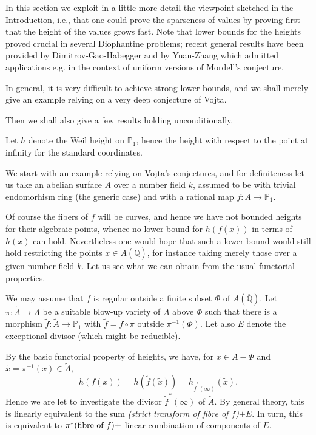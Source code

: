 \documentclass[leqno,12pt]{article} %
\def\Q{{{\mathbb Q}}}
\def\P{{{\mathbb P}}}
\theoremstyle{plain} %
\theoremstyle{definition} %
\begin{document}
In this section we exploit in a little more detail the viewpoint sketched in the Introduction, i.e., that one could prove the sparseness of values by proving first that the height of the values grows fast. Note that lower bounds for the heights proved crucial in several Diophantine problems; recent general results have been provided by {\sc Dimitrov-Gao-Habegger} \cite{DGH} and by {\sc Yuan-Zhang} \cite{YuZh} which admitted applications e.g. in the context of uniform versions of Mordell's conjecture.

In general, it is very difficult to achieve strong lower bounds, and we shall merely give an example relying on a very deep conjecture of {\sc Vojta}.

Then we shall also give a few results holding unconditionally.  %

\medskip

Let $h$ denote the Weil height on $\P_1$, hence the height with respect to the point at infinity for the standard coordinates.

We start with an example relying on Vojta's conjectures, and for definiteness let us take an abelian surface $A$ over a number field $k$, assumed to be with trivial endomorhism ring (the generic case) and with a rational map $f:A\to\P_1$. 

Of course the fibers of $f$ will be curves, and hence we  have not bounded heights for their algebraic points, whence no lower bound for $h(f(x))$ in terms of $h(x)$ can   hold. Nevertheless one would hope that such a lower bound would still hold restricting the points $x\in A(\overline\Q)$, for instance taking merely those over a given number field $k$. Let us see what we can obtain from the usual functorial properties. 

We may assume that $f$ is regular outside a finite subset $\Phi$ of $A(\overline\Q)$. Let $\pi: \tilde A\to A$ be a suitable blow-up variety of $A$ above $\Phi$ such that there is a morphism $\tilde f:\tilde A\to \P_1$  with $\tilde f= f\circ \pi$ outside $\pi^{-1}(\Phi)$. Let also $E$  denote the exceptional divisor (which might be reducible).

 By the basic  functorial property of heights, we have, for $x\in A-\Phi$ and $\tilde x=\pi^{-1}(x)\in\tilde A$, 
\begin{equation*}
h(f(x))=h(\tilde f(\tilde x))=h_{{\tilde f}^*(\infty)}(\tilde x).
\end{equation*}
Hence we are let to investigate the divisor ${\tilde f}^*(\infty)$ of $\tilde A$.  By general theory, this is linearly equivalent to the sum {\it  (strict transform of fibre of $f$)$+E$}.  In turn, this is equivalent to $\pi^*(\hbox{fibre of $f$}) +$ linear combination   of components of $E$.  
\end{document}
